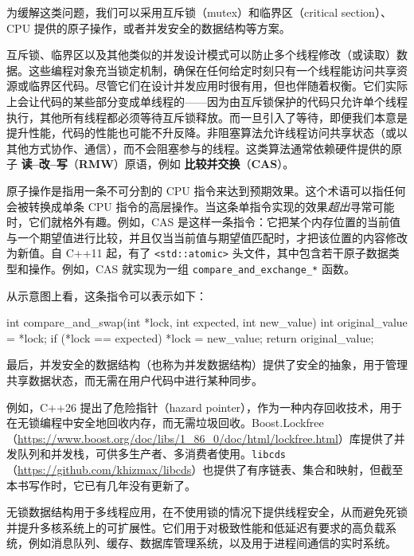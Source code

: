 为缓解这类问题，我们可以采用互斥锁（mutex）和临界区（critical section）、CPU 提供的原子操作，或者并发安全的数据结构等方案。

\label{idx:1022}
\label{idx:1023}
\label{idx:1024}
互斥锁、临界区以及其他类似的并发设计模式可以防止多个线程修改（或读取）数据。这些编程对象充当锁定机制，确保在任何给定时刻只有一个线程能访问共享资源或临界区代码。尽管它们在设计并发应用时很有用，但也伴随着权衡。它们实际上会让代码的某些部分变成单线程的——因为由互斥锁保护的代码只允许单个线程执行，其他所有线程都必须等待互斥锁释放。而一旦引入了等待，即便我们本意是提升性能，代码的性能也可能不升反降。非阻塞算法允许线程访问共享状态（或以其他方式协作、通信），而不会阻塞参与的线程。这类算法通常依赖硬件提供的原子 \textbf{读–改–写}（\textbf{RMW}）原语，例如 \textbf{比较并交换}（\textbf{CAS}）。

原子操作是指用一条不可分割的 CPU 指令来达到预期效果。这个术语可以指任何会被转换成单条 CPU 指令的高层操作。当这条单指令实现的效果\emph{超出}寻常可能时，它们就格外有趣。例如，CAS 是这样一条指令：它把某个内存位置的当前值与一个期望值进行比较，并且仅当当前值与期望值匹配时，才把该位置的内容修改为新值。自 C++11 起，有了 \texttt{<std::\allowbreak{}atomic>} 头文件，其中包含若干原子数据类型和操作。例如，CAS 就实现为一组 \texttt{compare\_\allowbreak{}and\_\allowbreak{}exchange\_\allowbreak{}*} 函数。

从示意图上看，这条指令可以表示如下：

\begin{codebox}[text]
int compare_and_swap(int *lock, int expected, int new_value)
{
  int original_value = *lock;
  if (*lock == expected)
  {
    *lock = new_value;
  }
  return original_value;
}
\end{codebox}

\label{idx:1025}
最后，并发安全的数据结构（也称为并发数据结构）提供了安全的抽象，用于管理共享数据状态，而无需在用户代码中进行某种同步。

\label{idx:1026}
例如，C++26 提出了危险指针（hazard pointer），作为一种内存回收技术，用于在无锁编程中安全地回收内存，而无需垃圾回收。Boost.Lockfree（\href{https://www.boost.org/doc/libs/1_86_0/doc/html/lockfree.html}{https://www.boost.org/doc/libs/1\_86\_0/doc/html/lockfree.html}）库提供了并发队列和并发栈，可供多生产者、多消费者使用。\texttt{libcds}（\href{https://github.com/khizmax/libcds}{https://github.com/khizmax/libcds}）也提供了有序链表、集合和映射，但截至本书写作时，它已有几年没有更新了。

无锁数据结构用于多线程应用，在不使用锁的情况下提供线程安全，从而避免死锁并提升多核系统上的可扩展性。它们用于对极致性能和低延迟有要求的高负载系统，例如消息队列、缓存、数据库管理系统，以及用于进程间通信的实时系统。

